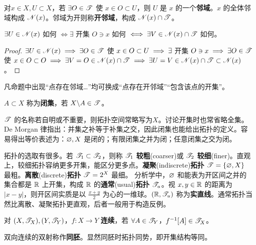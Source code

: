 \begin{definition}
    对$x\in X,U\subset X$，若 $\exists O\in\mathscr{T}$ 使 $x\in O\subset U$，则 $U$ 是 $x$ 的一个\textbf{邻域}。$x$ 的全体邻域构成 $\mathscr N(x)$。邻域为开则称\textbf{开邻域}，构成 $\mathscr N(x)\cap\mathscr T$。
\end{definition}

\begin{theorem}
    $\exists U \in\mathscr N(x)$ 如何 $\iff \exists$ 开集 $O\ni x$ 如何 $\iff \exists V \in\mathscr N(x)\cap\mathscr T$ 如何。
\end{theorem}
\begin{proof}
    $\exists U\in\mathscr N(x)\implies \exists O\in\mathscr T$ 使 $x\in O\subset U\implies \exists$ 开集 $O\ni x\implies\exists O\in\mathscr T$ 使 $x\in O\subset O\implies \exists V=O \in\mathscr N(x)\cap\mathscr T\implies\exists U=V\in\mathscr N(x)\cap\mathscr T\subset\mathscr N(x)$。
\end{proof}
\begin{remark}
    凡命题中出现“点存在邻域…”均可换成“点存在开邻域”“包含该点的开集”。
\end{remark}

\begin{definition}\label{def:closed-set}
    $A\subset X$ 称为\textbf{闭集}，若 $X\backslash A\in\mathscr{T}$。
\end{definition}

$\mathscr T$ 的名称若自明或不重要，则拓扑空间常略写为$X$。讨论开集时也常省略全集。De Morgan 律指出：并集之补等于补集之交，因此闭集也能给出拓扑的定义。容易得出等价表述为：$\varnothing,X$ 是闭的；有限闭集之并为闭；任意闭集之交为闭。

拓扑的选取有很多。若 $\mathscr T_1\subset\mathscr T_2$，则称 $\mathscr T_1$ \textbf{较粗}(coarser)或 $\mathscr T_2$ \textbf{较细}(finer)。直观上，较细拓扑容纳更多开集，能区分更多点。\textbf{凝聚}(indiscrete)\textbf{拓扑} $\mathscr T=\{\varnothing,X\}$ 最粗。\textbf{离散}(discrete)\textbf{拓扑} $\mathscr T= 2^X$ 最细。
分析学中，$\varnothing$ 和能表为开区间之并的集合都是 $\mathbb{R}$ 上开集，构成 $\mathbb{R}$ 的\textbf{通常}(usual)\textbf{拓扑} $\mathscr T_u$。视 $x,y\in\mathbb{R}$ 的距离为 $|x-y|$，则开区间实质是以 $\frac{x+y}{2}$ 为心的一维球。$(\mathbb{R},\mathscr T_u)$ 称为\textbf{实直线}。通常拓扑当然比离散、凝聚拓扑更直观，后者一般用于构造反例。

\begin{definition}
    对 $(X,\mathscr T_X),(Y,\mathscr T_Y)$，$f: X \to Y$ \textbf{连续}，若 $\forall A\in\mathscr T_Y$，$f^{-1}[A]\in \mathscr T_X$。
\end{definition}

\begin{definition}
    双向连续的双射称作\textbf{同胚}。显然同胚时拓扑同势，即开集结构等同。
\end{definition}

